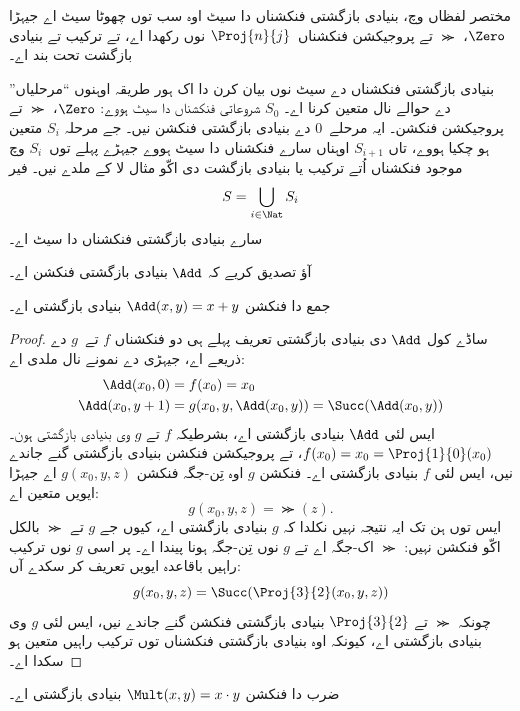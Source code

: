 \documentclass[../../../include/open-logic-section]{subfiles}
\begin{document}
\begin{explain}
مختصر لفظاں وچ، بنیادی بازگشتی فنکشناں دا سیٹ
اوہ سب توں چھوٹا سیٹ اے جیہڑا $\Zero$،
$\Succ$ تے پروجیکشن فنکشناں~$\Proj{n}{j}$
نوں رکھدا اے، تے ترکیب تے بنیادی بازگشت
تحت بند اے۔

بنیادی بازگشتی فنکشناں دے سیٹ نوں بیان کرن
دا اک ہور طریقہ اوہنوں ``مرحلیاں'' دے
حوالے نال متعین کرنا اے۔ $S_0$ شروعاتی
فنکشناں دا سیٹ ہووے: $\Zero$، $\Succ$
تے پروجیکشن فنکشن۔ ایہ مرحلے~$0$ دے
بنیادی بازگشتی فنکشن نیں۔ جے مرحلہ $S_i$
متعین ہو چکیا ہووے، تاں $S_{i+1}$ اوہناں
سارے فنکشناں دا سیٹ ہووے جیہڑے پہلے توں~$S_i$
وچ موجود فنکشناں اُتے ترکیب یا بنیادی بازگشت
دی اکّو مثال لا کے ملدے نیں۔ فیر
\[
S = \bigcup_{i \in \Nat} S_i
\]
سارے بنیادی بازگشتی فنکشناں دا سیٹ اے۔
\end{explain}

آؤ تصدیق کریے کہ $\Add$ بنیادی بازگشتی
فنکشن اے۔

\begin{prop}
  جمع دا فنکشن $\Add(x,y) = x+y$ بنیادی بازگشتی اے۔
\end{prop}

\begin{proof}
ساڈے کول $\Add$ دی بنیادی بازگشتی تعریف
پہلے ہی دو فنکشناں $f$ تے~$g$ دے
ذریعے اے، جیہڑی 
دے نمونے نال ملدی اے:
\begin{align*}
  \Add(x_0, 0) & = f(x_0) = x_0\\
  \Add(x_0, y+1) & = g(x_0, y, \Add(x_0, y)) =
  \Succ(\Add(x_0, y))
\end{align*}
ایس لئی $\Add$ بنیادی بازگشتی اے،
بشرطیکہ $f$ تے $g$ وی بنیادی بازگشتی ہون۔
$f(x_0) = x_0 = \Proj{1}{0}(x_0)$،
تے پروجیکشن فنکشن بنیادی بازگشتی گنے جاندے
نیں، ایس لئی $f$ بنیادی بازگشتی اے۔
فنکشن $g$ اوہ تِن-جگہ فنکشن
$g(x_0, y, z)$ اے جیہڑا ایویں متعین اے:
\[
g(x_0, y, z) = \Succ(z).
\]
ایس توں ہن تک ایہ نتیجہ نہیں نکلدا کہ
$g$ بنیادی بازگشتی اے، کیوں جے $g$
تے $\Succ$ بالکل اکّو فنکشن نہیں:
$\Succ$ اک-جگہ اے تے $g$ نوں تِن-جگہ
ہونا پیندا اے۔ پر اسی $g$ نوں ترکیب
راہیں باقاعدہ ایویں تعریف کر سکدے آں:
\[
g(x_0, y, z) = \Succ(\Proj{3}{2}(x_0, y, z))
\]
چونکہ $\Succ$ تے $\Proj{3}{2}$
بنیادی بازگشتی فنکشن گنے جاندے نیں،
ایس لئی $g$ وی بنیادی بازگشتی اے،
کیونکہ اوہ بنیادی بازگشتی فنکشناں توں
ترکیب راہیں متعین ہو سکدا اے۔
\end{proof}

\begin{prop}
  ضرب دا فنکشن $\Mult(x,y) = x \cdot y$ بنیادی بازگشتی اے۔
\end{prop}
\end{document}
